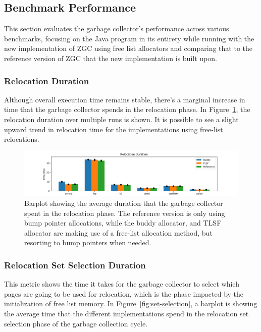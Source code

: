 \subsection{Benchmark Performance}
This section evaluates the garbage collector's performance across various benchmarks, focusing on the Java program in its entirety while running with the new implementation of ZGC using free list allocators and comparing that to the reference version of ZGC that the new implementation is built upon.


\subsubsection{Relocation Duration}

Although overall execution time remains stable, there's a marginal increase in time that the garbage collector spends in the relocation phase. In Figure~\ref{fig:relocation-duration}, the relocation duration over multiple runs is shown. It is possible to see a slight upward trend in relocation time for the implementations using free-list relocations. 

\begin{figure}[H]
\centering
\includegraphics[width=1\textwidth]{figures/relocation.png}
\caption{Barplot showing the average duration that the garbage collector spent in the relocation phase. The reference version is only using bump pointer allocations, while the buddy allocator, and TLSF allocator are making use of a free-list allocation method, but resorting to bump pointers when needed.}
\label{fig:relocation-duration}
\end{figure}

\subsubsection{Relocation Set Selection Duration}

This metric shows the time it takes for the garbage collector to select which pages are going to be used for relocation, which is the phase impacted by the initialization of free list memory. In Figure~\ref{fig:set-selection}, a barplot is showing the average time that the different implementations spend in the relocation set selection phase of the garbage collection cycle.

